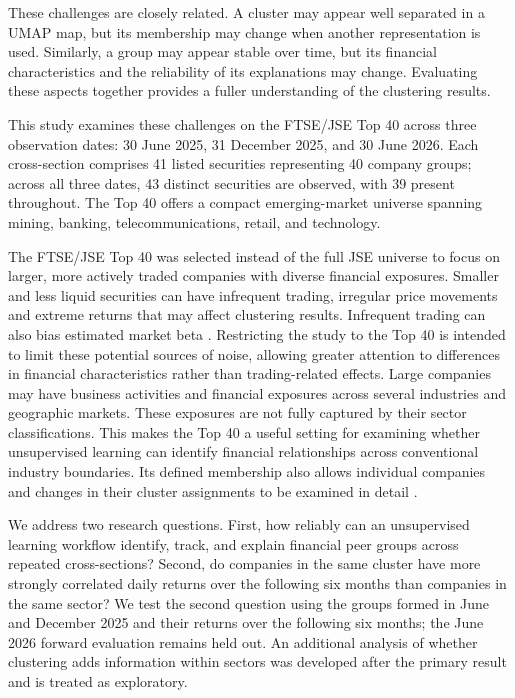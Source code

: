 These challenges are closely related. A cluster may appear well separated in a UMAP map, but its membership may change when another representation is used. Similarly, a group may appear stable over time, but its financial characteristics and the reliability of its explanations may change. Evaluating these aspects together provides a fuller understanding of the clustering results.

This study examines these challenges on the FTSE/JSE Top 40 across three observation dates: 30 June 2025, 31 December 2025, and 30 June 2026. Each cross-section comprises 41 listed securities representing 40 company groups; across all three dates, 43 distinct securities are observed, with 39 present throughout. The Top 40 offers a compact emerging-market universe spanning mining, banking, telecommunications, retail, and technology.

The FTSE/JSE Top 40 was selected instead of the full JSE universe to focus on larger, more actively traded companies with diverse financial exposures. Smaller and less liquid securities can have infrequent trading, irregular price movements and extreme returns that may affect clustering results. Infrequent trading can also bias estimated market beta \citep{dimson1979}. Restricting the study to the Top 40 is intended to limit these potential sources of noise, allowing greater attention to differences in financial characteristics rather than trading-related effects. Large companies may have business activities and financial exposures across several industries and geographic markets. These exposures are not fully captured by their sector classifications. This makes the Top 40 a useful setting for examining whether unsupervised learning can identify financial relationships across conventional industry boundaries. Its defined membership also allows individual companies and changes in their cluster assignments to be examined in detail \citep{jseheadline,jse2024liquidity}.

We address two research questions. First, how reliably can an unsupervised learning workflow identify, track, and explain financial peer groups across repeated cross-sections? Second, do companies in the same cluster have more strongly correlated daily returns over the following six months than companies in the same sector? We test the second question using the groups formed in June and December 2025 and their returns over the following six months; the June 2026 forward evaluation remains held out. An additional analysis of whether clustering adds information within sectors was developed after the primary result and is treated as exploratory.

